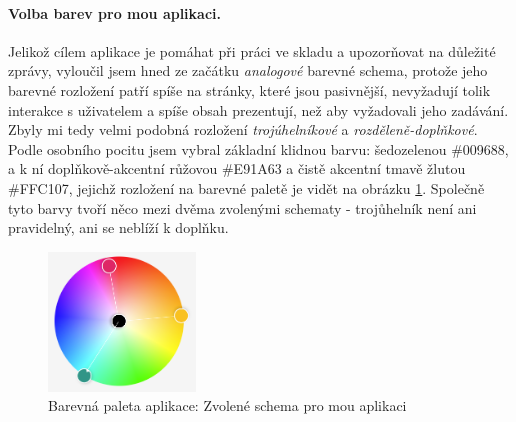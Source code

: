 \paragraph{Volba barev pro mou aplikaci.} Jelikož cílem aplikace je pomáhat při práci ve skladu a upozorňovat na důležité zprávy, vyloučil jsem hned ze začátku \emph{analogové} barevné schema, protože jeho barevné rozložení patří spíše na stránky, které jsou pasivnější, nevyžadují tolik interakce s uživatelem a spíše obsah prezentují, než aby vyžadovali jeho zadávání. Zbyly mi tedy velmi podobná rozložení \emph{trojúhelníkové} a \emph{rozděleně-doplňkové}. Podle osobního pocitu jsem vybral základní klidnou barvu: šedozelenou \#009688, a k ní doplňkově-akcentní růžovou \#E91A63 a čistě akcentní tmavě žlutou \#FFC107, jejichž rozložení na barevné paletě je vidět na obrázku \ref{picture:colors:app}. Společně tyto barvy tvoří něco mezi dvěma zvolenými schematy - trojůhelník není ani pravidelný, ani se neblíží k doplňku.\\

\begin{figure}[h]
    \includegraphics[width=0.35\textwidth]{../png/colors/app.png}
    \caption{Barevná paleta aplikace: Zvolené schema pro mou aplikaci} \label{picture:colors:app}
\end{figure}

